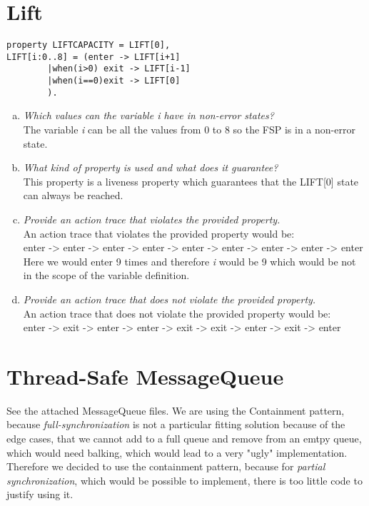 \documentclass{report}
\begin{document}
	\section{Lift}
	\startsection
		\begin{verbatim}
property LIFTCAPACITY = LIFT[0],
LIFT[i:0..8] = (enter -> LIFT[i+1]
		|when(i>0) exit -> LIFT[i-1]
		|when(i==0)exit -> LIFT[0]
		).
		\end{verbatim}
		\begin{enumerate}[a)]
			\item \textit{Which values can the variable i have in non-error states?} \\
			The variable \textit{i} can be all the values from 0 to 8 so the FSP is in a non-error state.
			\item \textit{What kind of property is used and what does it guarantee?} \\
			This property is a liveness property which guarantees that the LIFT[0] state can always be reached.
			\item \textit{Provide an action trace that violates the provided property.} \\
			An action trace that violates the provided property would be: \\
			enter -> enter -> enter -> enter -> enter -> enter -> enter -> enter -> enter \\
			Here we would enter 9 times and therefore \textit{i} would be 9 which would be not in the scope of the variable definition.
			\item \textit{Provide an action trace that does not violate the provided property.} \\
			An action trace that does not violate the provided property would be: \\
			enter -> exit -> enter -> enter -> exit -> exit -> enter -> exit -> enter \\
		\end{enumerate}
	\closesection
	
	\section{Thread-Safe MessageQueue}
	\startsection
		See the attached MessageQueue files. We are using the Containment pattern, because \textit{full-synchronization} is not a particular fitting solution because of the edge cases, that we cannot add to a full queue and remove from an emtpy queue, which would need balking, which would lead to a very "ugly" implementation. Therefore we decided to use the containment pattern, because for \textit{partial synchronization}, which would be possible to implement, there is too little code to justify using it.
	\closesection
\end{document}
